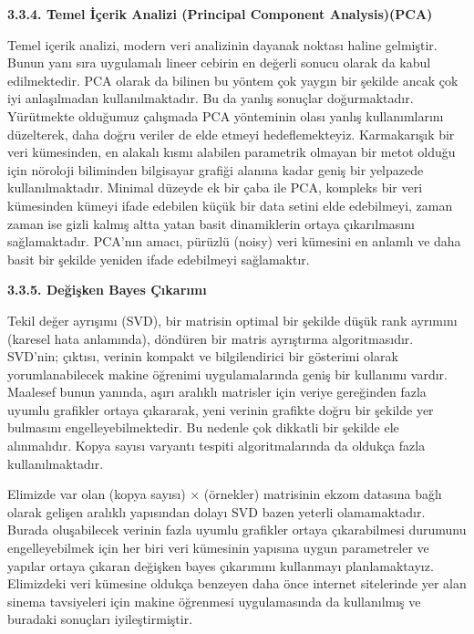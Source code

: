 \documentclass[11pt]{article}
\begin{document}
{\bf 3.3.4. Temel İçerik Analizi (Principal Component Analysis)(PCA)}

Temel içerik analizi, modern veri analizinin dayanak  noktası haline gelmiştir. Bunun yanı sıra uygulamalı lineer cebirin en değerli sonucu olarak da kabul edilmektedir. PCA olarak da bilinen bu yöntem çok yaygın bir şekilde ancak çok iyi anlaşılmadan kullanılmaktadır. Bu da yanlış sonuçlar doğurmaktadır. Yürütmekte olduğumuz çalışmada PCA yönteminin olası yanlış kullanımlarını düzelterek, daha doğru veriler de elde etmeyi hedeflemekteyiz. Karmakarışık bir veri kümesinden, en alakalı kısmı alabilen parametrik olmayan bir metot olduğu için nöroloji biliminden bilgisayar grafiği alanına kadar geniş bir yelpazede kullanılmaktadır. Minimal düzeyde ek bir çaba ile PCA, kompleks bir veri kümesinden kümeyi ifade edebilen küçük bir data setini elde edebilmeyi, zaman zaman ise gizli kalmış altta yatan basit dinamiklerin ortaya çıkarılmasını sağlamaktadır. PCA'nın amacı,  pürüzlü (noisy) veri kümesini en anlamlı ve daha basit bir şekilde yeniden ifade edebilmeyi sağlamaktır.


{\bf 3.3.5. Değişken Bayes Çıkarımı}


Tekil değer ayrışımı (SVD), bir matrisin optimal bir şekilde düşük rank ayrımını (karesel hata anlamında), döndüren bir matris  ayrıştırma algoritmasıdır. SVD'nin; çıktısı, verinin kompakt ve bilgilendirici bir gösterimi olarak yorumlanabilecek makine öğrenimi uygulamalarında geniş bir kullanımı vardır. Maalesef bunun yanında, aşırı aralıklı matrisler için veriye gereğinden fazla uyumlu grafikler ortaya çıkararak, yeni verinin grafikte doğru bir şekilde yer bulmasını engelleyebilmektedir. Bu nedenle çok dikkatli bir şekilde ele alınmalıdır. Kopya sayısı varyantı tespiti algoritmalarında da  oldukça fazla kullanılmaktadır.

Elimizde var olan (kopya sayısı) $\times$ (örnekler) matrisinin  ekzom datasına bağlı olarak gelişen aralıklı yapısından dolayı SVD bazen yeterli olamamaktadır. Burada oluşabilecek verinin fazla uyumlu grafikler ortaya çıkarabilmesi durumunu engelleyebilmek için her biri veri kümesinin yapısına uygun parametreler ve yapılar ortaya çıkaran değişken bayes çıkarımını kullanmayı planlamaktayız. Elimizdeki veri kümesine oldukça benzeyen daha önce internet sitelerinde yer alan sinema tavsiyeleri için makine öğrenmesi uygulamasında da kullanılmış ve buradaki sonuçları iyileştirmiştir.
\end{document}
